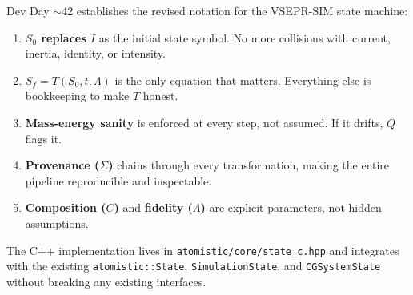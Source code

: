 \documentclass[11pt]{article}
\begin{document}
Dev Day $\sim$42 establishes the revised notation for the VSEPR-SIM state machine:

\begin{enumerate}
  \item \textbf{$S_0$ replaces $I$} as the initial state symbol. No more collisions with current, inertia, identity, or intensity.
  \item \textbf{$S_f = T(S_0, t, \Lambda)$} is the only equation that matters. Everything else is bookkeeping to make $T$ honest.
  \item \textbf{Mass-energy sanity} is enforced at every step, not assumed. If it drifts, $Q$ flags it.
  \item \textbf{Provenance ($\Sigma$)} chains through every transformation, making the entire pipeline reproducible and inspectable.
  \item \textbf{Composition ($C$)} and \textbf{fidelity ($\Lambda$)} are explicit parameters, not hidden assumptions.
\end{enumerate}

The C++ implementation lives in \texttt{atomistic/core/state\_c.hpp} and integrates with the existing \texttt{atomistic::State}, \texttt{SimulationState}, and \texttt{CGSystemState} without breaking any existing interfaces.
\end{document}
